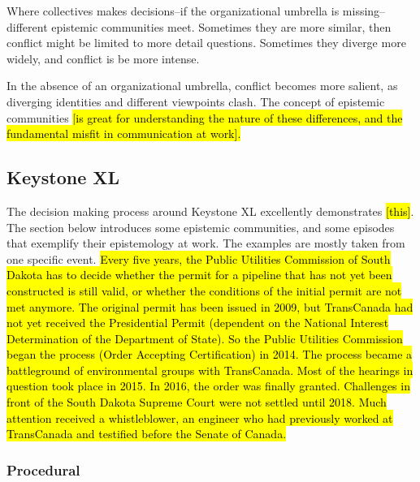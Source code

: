 \documentclass{article}
\begin{document}
	Where collectives makes decisions--if the organizational umbrella is missing--different epistemic communities meet. Sometimes they are more similar, then conflict might be limited to more detail questions. Sometimes they diverge more widely, and conflict is be more intense.

	In the absence of an organizational umbrella, conflict becomes more salient, as diverging identities and different viewpoints clash. The concept of epistemic communities \hl{[is great for understanding the nature of these differences, and the fundamental misfit in communication at work].}

	\subsection*{Keystone XL}

	The decision making process around Keystone XL excellently demonstrates \hl{[this]}. The section below introduces some epistemic communities, and some episodes that exemplify their epistemology at work. The examples are mostly taken from one specific event. \hl{Every five years, the Public Utilities Commission of South Dakota has to decide whether the permit for a pipeline that has not yet been constructed is still valid, or whether the conditions of the initial permit are not met anymore. The original permit has been issued in 2009, but TransCanada had not yet received the Presidential Permit (dependent on the National Interest Determination of the Department of State). So the Public Utilities Commission began the process (Order Accepting Certification) in 2014. The process became a battleground of environmental groups with TransCanada. Most of the hearings in question took place in 2015. In 2016, the order was finally granted. Challenges in front of the South Dakota Supreme Court were not settled until 2018. Much attention received a whistleblower, an engineer who had previously worked at TransCanada and testified before the Senate of Canada.}

	\subsubsection*{Procedural}
\end{document}
